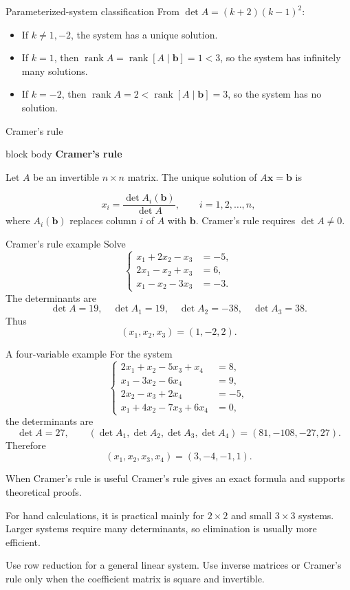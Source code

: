 \documentclass[aspectratio=169]{beamer}
\newcommand{\vect}[1]{\mathbf{#1}}
\newcommand{\rank}{\operatorname{rank}}
\newcommand{\theorembox}[2]{%
  \begin{beamercolorbox}[sep=1.1ex,wd=\linewidth]{block body}
    \textbf{#1}\par #2
  \end{beamercolorbox}}
\begin{document}
\begin{frame}{Parameterized-system classification}
From $\det A=(k+2)(k-1)^2$:
\begin{itemize}
  \item If $k\ne1,-2$, the system has a unique solution.
  \item If $k=1$, then $\rank A=\rank[A\mid\vect b]=1<3$, so the system has infinitely many solutions.
  \item If $k=-2$, then $\rank A=2<\rank[A\mid\vect b]=3$, so the system has no solution.
\end{itemize}
\end{frame}

\begin{frame}{Cramer's rule}
\theorembox{Cramer's rule}{Let $A$ be an invertible $n\times n$ matrix. The unique solution of $A\vect x=\vect b$ is}
\[
\boxed{x_i=\frac{\det A_i(\vect b)}{\det A}},
\qquad i=1,2,\ldots,n,
\]
where $A_i(\vect b)$ replaces column $i$ of $A$ with $\vect b$.
\pause
Cramer's rule requires $\det A\ne0$.
\end{frame}

\begin{frame}{Cramer's rule example}
Solve
\[
\left\{\begin{aligned}
x_1+2x_2-x_3&=-5,\\
2x_1-x_2+x_3&=6,\\
x_1-x_2-3x_3&=-3.
\end{aligned}\right.
\]
The determinants are
\[
\det A=19,
\quad \det A_1=19,
\quad \det A_2=-38,
\quad \det A_3=38.
\]
Thus
\[
\boxed{(x_1,x_2,x_3)=(1,-2,2)}.
\]
\end{frame}

\begin{frame}{A four-variable example}
\small
For the system
\[
\left\{\begin{aligned}
2x_1+x_2-5x_3+x_4&=8,\\
x_1-3x_2-6x_4&=9,\\
2x_2-x_3+2x_4&=-5,\\
x_1+4x_2-7x_3+6x_4&=0,
\end{aligned}\right.
\]
the determinants are
\[
\det A=27,
\qquad
(\det A_1,\det A_2,\det A_3,\det A_4)=(81,-108,-27,27).
\]
Therefore
\[
\boxed{(x_1,x_2,x_3,x_4)=(3,-4,-1,1)}.
\]
\end{frame}

\begin{frame}{When Cramer's rule is useful}
Cramer's rule gives an exact formula and supports theoretical proofs.
\medskip

For hand calculations, it is practical mainly for $2\times2$ and small $3\times3$ systems. Larger systems require many determinants, so elimination is usually more efficient.
\medskip

Use row reduction for a general linear system. Use inverse matrices or Cramer's rule only when the coefficient matrix is square and invertible.
\end{frame}
\end{document}
